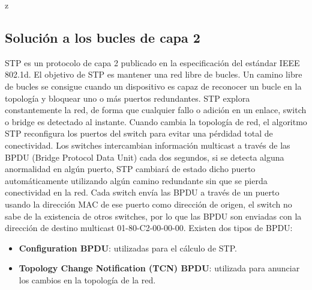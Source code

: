 z\documentclass[12pt]{article}
\begin{document}
 \subsection{Solución a los bucles de capa 2}
STP es un protocolo de capa 2 publicado en la especificación del estándar IEEE 802.1d.
El objetivo de STP es mantener una red libre de bucles. Un camino libre de bucles se consigue cuando un dispositivo es capaz de reconocer un bucle en la topología y bloquear uno o más puertos redundantes.
STP explora constantemente la red, de forma que cualquier fallo o adición en un enlace, switch o bridge es detectado al instante. Cuando cambia la topología de red, el algoritmo STP reconfigura los puertos del switch para evitar una pérdidad total de conectividad.
Los switches intercambian información multicast a través de las BPDU (Bridge Protocol Data Unit) cada dos segundos, si se detecta alguna anormalidad en algún puerto, STP cambiará de estado dicho puerto automáticamente utilizando algún camino redundante sin que se pierda conectividad en la red.
Cada switch envía las BPDU a través de un puerto usando la dirección MAC de ese puerto como dirección de origen, el switch no sabe de la existencia de otros switches, por lo que las BPDU son enviadas con la dirección de destino multicast 01-80-C2-00-00-00.
Existen dos tipos de BPDU:
\begin{itemize}
\item \textbf{Configuration BPDU}: utilizadas para el cálculo de STP.
\item \textbf{Topology Change Notification (TCN) BPDU}: utilizada para anunciar los cambios en la topología de la red.
\end{itemize}
\end{document}
